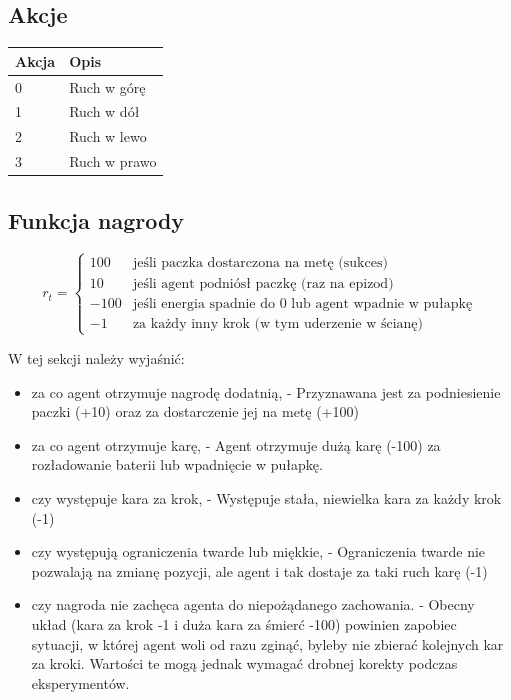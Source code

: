 \documentclass[12pt]{article}
\begin{document}
\subsection{Akcje}



\begin{center}
\begin{tabular}{p{}p{}}
\toprule
Akcja & Opis \\
\midrule
0 & Ruch w górę \\
1 & Ruch w dół \\
2 & Ruch w lewo \\
3 & Ruch w prawo \\
\bottomrule
\end{tabular}
\end{center}

\subsection{Funkcja nagrody}


\begin{equation}
    r_t = \begin{cases}
        100 & \text{jeśli paczka dostarczona na metę (sukces)} \\
        10 & \text{jeśli agent podniósł paczkę (raz na epizod)} \\
        -100 & \text{jeśli energia spadnie do 0 lub agent wpadnie w pułapkę} \\
        -1 & \text{za każdy inny krok (w tym uderzenie w ścianę)}
    \end{cases}
\end{equation}

W tej sekcji należy wyjaśnić:
\begin{itemize}
    \item za co agent otrzymuje nagrodę dodatnią, - Przyznawana jest za podniesienie paczki (+10) oraz za dostarczenie jej na metę (+100)
    \item za co agent otrzymuje karę, - Agent otrzymuje dużą karę (-100) za rozładowanie baterii lub wpadnięcie w pułapkę.
    \item czy występuje kara za krok, - Występuje stała, niewielka kara za każdy krok (-1)
    \item czy występują ograniczenia twarde lub miękkie, - Ograniczenia twarde nie pozwalają na zmianę pozycji, ale agent i tak dostaje za taki ruch karę (-1)
    \item czy nagroda nie zachęca agenta do niepożądanego zachowania. - Obecny układ (kara za krok -1 i duża kara za śmierć -100) powinien zapobiec sytuacji, w której agent woli od razu zginąć, byleby nie zbierać kolejnych kar za kroki. Wartości te mogą jednak wymagać drobnej korekty podczas eksperymentów.
\end{itemize}
\end{document}
